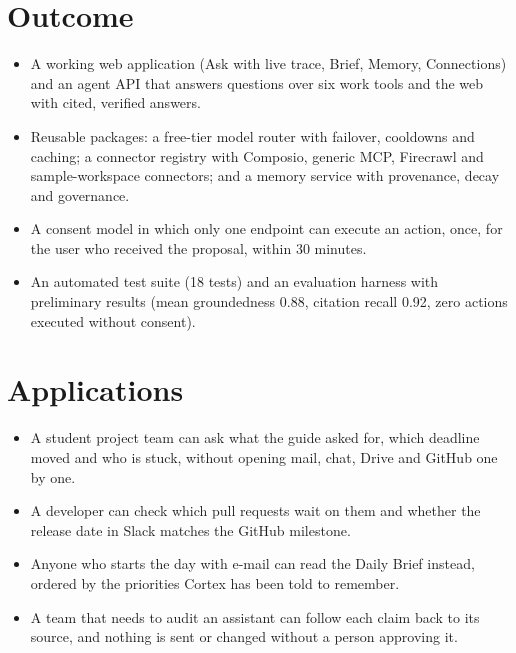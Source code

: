 \documentclass[oneside,a4paper,12pt]{report}
\begin{document}
\section{Outcome}
\begin{itemize}
\item A working web application (Ask with live trace, Brief, Memory, Connections) and an agent API that answers questions over six work tools and the web with cited, verified answers.
\item Reusable packages: a free-tier model router with failover, cooldowns and caching; a connector registry with Composio, generic MCP, Firecrawl and sample-workspace connectors; and a memory service with provenance, decay and governance.
\item A consent model in which only one endpoint can execute an action, once, for the user who received the proposal, within 30 minutes.
\item An automated test suite (18 tests) and an evaluation harness with preliminary results (mean groundedness 0.88, citation recall 0.92, zero actions executed without consent).
\end{itemize}

\section{Applications}
\begin{itemize}
\item A student project team can ask what the guide asked for, which deadline moved and who is stuck, without opening mail, chat, Drive and GitHub one by one.
\item A developer can check which pull requests wait on them and whether the release date in Slack matches the GitHub milestone.
\item Anyone who starts the day with e-mail can read the Daily Brief instead, ordered by the priorities Cortex has been told to remember.
\item A team that needs to audit an assistant can follow each claim back to its source, and nothing is sent or changed without a person approving it.
\end{itemize}
\end{document}
